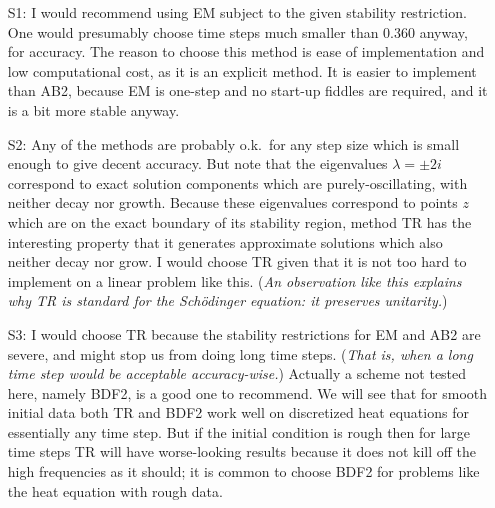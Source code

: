 \documentclass[11pt]{amsart}
\begin{document}
\begin{itemize}
\item[S1:] I would recommend using EM subject to the given stability restriction.  One would presumably choose time steps much smaller than 0.360 anyway, for accuracy.  The reason to choose this method is ease of implementation and low computational cost, as it is an explicit method.  It is easier to implement than AB2, because EM is one-step and no start-up fiddles are required, and it is a bit more stable anyway.
\item[S2:] Any of the methods are probably o.k.~for any step size which is small enough to give decent accuracy.  But note that the eigenvalues $\lambda=\pm 2 i$ correspond to exact solution components which are purely-oscillating, with neither decay nor growth.  Because these eigenvalues correspond to points $z$ which are on the exact boundary of its stability region, method TR has the interesting property that it generates approximate solutions which also neither decay nor grow.  I would choose TR given that it is not too hard to implement on a linear problem like this.  (\emph{An observation like this explains why TR is standard for the Sch\"odinger equation: it preserves unitarity.})
\item[S3:] I would choose TR because the stability restrictions for EM and AB2 are severe, and might stop us from doing long time steps.  (\emph{That is, when a long time step would be acceptable accuracy-wise.})  Actually a scheme not tested here, namely BDF2, is a good one to recommend.  We will see that for smooth initial data both TR and BDF2 work well on discretized heat equations for essentially any time step.  But if the initial condition is rough then for large time steps TR will have worse-looking results because it does not kill off the high frequencies as it should; it is common to choose BDF2 for problems like the heat equation with rough data.
\end{itemize}
\end{document}
